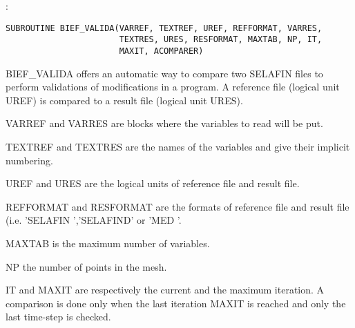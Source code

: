 %
%
%
%

:
\begin{lstlisting}[language=TelFortran]
SUBROUTINE BIEF_VALIDA(VARREF, TEXTREF, UREF, REFFORMAT, VARRES,
                       TEXTRES, URES, RESFORMAT, MAXTAB, NP, IT,
                       MAXIT, ACOMPARER)
\end{lstlisting}

BIEF\_VALIDA offers an automatic way to compare two SELAFIN files to perform
validations of modifications in a program. A reference file (logical unit UREF)
is compared to a result file (logical unit URES).

VARREF and VARRES are blocks where the variables to read will be put.

TEXTREF and TEXTRES are the names of the variables and give their implicit
numbering.

UREF and URES are the logical units of reference file and result file.

REFFORMAT and RESFORMAT are the formats of reference file and result file (i.e.
'SELAFIN ','SELAFIND' or 'MED     '.

MAXTAB is the maximum number of variables.

NP the number of points in the mesh.

IT and MAXIT are respectively the current and the maximum iteration. A
comparison is done only when the last iteration MAXIT is reached and only the
last time-step is checked.

